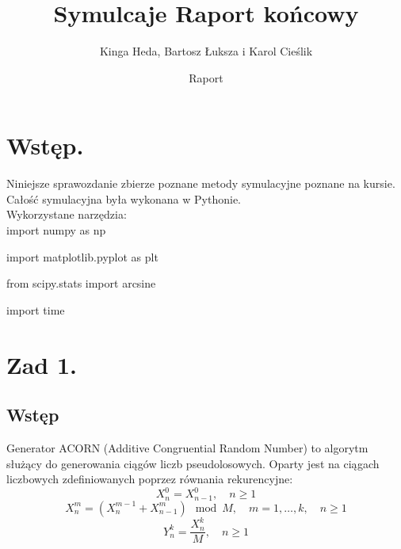 \documentclass[12pt,letterpaper]{article}
\title{Symulcaje Raport końcowy}
\author{Kinga Heda, Bartosz Łuksza i Karol Cieślik}
\date{Raport}
\theoremstyle{definition}
\begin{document}
\setcounter{page}{1} %
\maketitle


\tableofcontents


%





\section{Wstęp.}
Niniejsze sprawozdanie zbierze poznane metody symulacyjne poznane na kursie.
Całość symulacyjna była wykonana w Pythonie.\\

Wykorzystane narzędzia:\\

import numpy as np

import matplotlib.pyplot as plt

from scipy.stats import arcsine

import time

\section{Zad 1.}

\subsection{Wstęp}
Generator ACORN (Additive Congruential Random Number) to algorytm służący do generowania ciągów liczb pseudolosowych. Oparty jest na ciągach liczbowych zdefiniowanych poprzez równania rekurencyjne:
\[
X^0_n = X^0_{n-1}, \quad n \geq 1
\]
\[
X^m_n = (X^{m-1}_n + X^m_{n-1}) \mod M, \quad m = 1, \ldots, k, \quad n \geq 1
\]
\[
Y^k_n = \frac{X^k_n}{M}, \quad n \geq 1
\]
\end{document}
